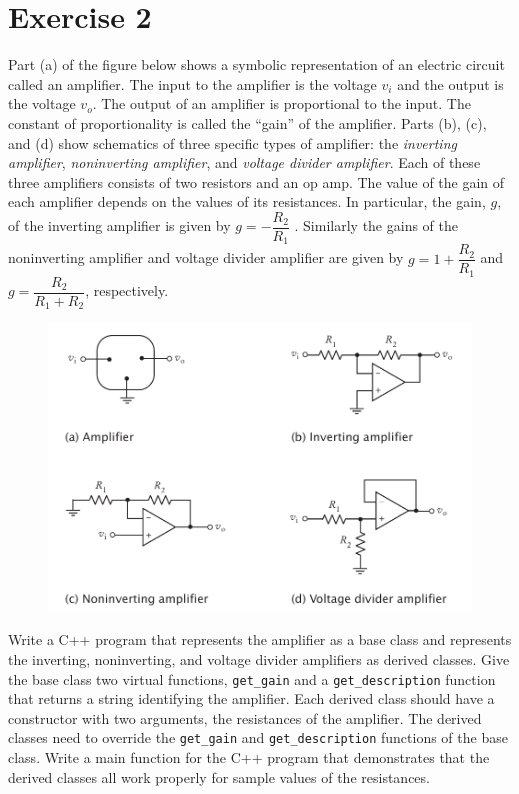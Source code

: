 \documentclass[10pt,a4paper]{article}
\begin{document}
	\section*{Exercise 2}
	Part (a) of the figure below shows a symbolic representation of an electric circuit called an amplifier. The input to the amplifier is the voltage $ v_i $ and the output is the voltage $ v_o $. The output of an amplifier is proportional to the input. The constant of proportionality is called the “gain” of the amplifier. Parts (b), (c), and (d) show schematics of three specific types of amplifier: the \emph{inverting amplifier}, \emph{noninverting amplifier}, and \emph{voltage divider amplifier}. Each of these three amplifiers consists of two resistors and an op amp. The value of the gain of each amplifier depends on the values of its resistances. In particular, the gain, $ g $, of the inverting amplifier is given by $ g = -\dfrac{R_2}{R_1} $ . Similarly the gains of the noninverting  amplifier and voltage divider amplifier are given by $ g = 1 + \dfrac{R_2}{R_1}  $ and $g = \dfrac{R_2}{R_1+R_2}$, respectively.
	\begin{figure}[H]
		\centering
		\includegraphics[width=0.7\linewidth]{amplifiers}
	\end{figure}
	
	Write a C++ program that represents the amplifier as a base class and represents the inverting, noninverting, and voltage divider amplifiers as derived classes. Give the base class two virtual functions, \verb|get_gain| and a \verb|get_description| function that returns a string identifying the amplifier. Each derived class should have a constructor with two arguments, the resistances of the amplifier. The derived classes need to override the \verb|get_gain| and \verb|get_description| functions of the base class. Write a main function for the C++ program that demonstrates that the derived classes all work properly for sample values of the resistances.
\end{document}
